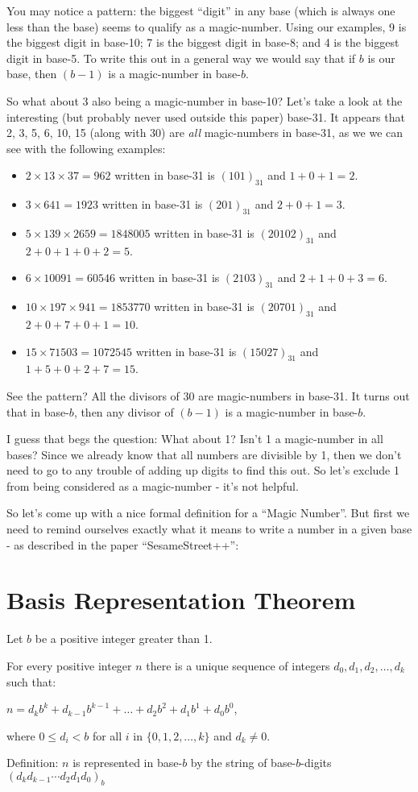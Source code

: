 \documentclass{article}
\newenvironment{jprIn}{\begin{adjustwidth}{2em}{}}{\end{adjustwidth}}
\begin{document}
You may notice a pattern: the biggest ``digit'' in any base (which is always one less than the base) seems to
qualify as a magic-number.
Using our examples, 9 is the biggest
digit in base-10; 7 is the biggest digit in base-8; and 4 is the biggest digit in base-5.  To write this out in a general way
we would say that if $b$ is our base, then $(b-1)$ is a magic-number in base-$b$.

So what about 3 also being a magic-number in base-10?  Let's take a look at the interesting (but probably never used outside this paper) base-31.
It appears that 2, 3, 5, 6, 10, 15 (along with 30) are \emph{all} magic-numbers in base-31, as we we can see
with the following examples:
\begin{itemize}
\item $2\times{}13\times{}37=962$ written in base-31 is $(101)_{31}$ and $1+0+1=2$.
\item $3\times{}641=1923$ written in base-31 is $(201)_{31}$ and $2+0+1=3$.
\item $5\times{}139\times{}2659=1848005$ written in base-31 is $(20102)_{31}$ and $2+0+1+0+2=5$.
\item $6\times{}10091=60546$ written in base-31 is $(2103)_{31}$ and $2+1+0+3=6$.
\item $10\times{}197\times{}941=1853770$ written in base-31 is $(20701)_{31}$ and $2+0+7+0+1=10$.
\item $15\times{}71503=1072545$ written in base-31 is $(15027)_{31}$ and $1+5+0+2+7=15$.
\end{itemize}

See the pattern? All the divisors of 30 are magic-numbers in base-31.
It turns out that in base-$b$, then any divisor of $(b-1)$ is a magic-number in base-$b$.

I guess that begs the question: What about 1? Isn't 1 a magic-number in all bases?
Since we already know that all numbers are divisible by 1,
then we don't need to go to any trouble of adding up digits to find this out.
So let's exclude 1 from being considered as a magic-number - it's not helpful.

So let's come up with a nice formal definition for a ``Magic Number''. But first we need to remind ourselves exactly
what it means to write a number in a given base - as described in the paper ``SesameStreet++'':

\section*{Basis Representation Theorem}
\begin{jprIn}
Let $b$ be a positive integer greater than 1.

For every positive integer $n$ there is a unique sequence
of integers $d_0, d_1, d_2,\dots{},d_k$ such that:

\hspace{3em}$n=d_kb^k+d_{k-1}b^{k-1}+\dots+d_2b^2+d_1b^1+d_0b^0$,

where $0\le{}d_i<b$ for all $i$ in $\{0,1,2,\dots{},k\}$ and $d_k\ne0$.

Definition: $n$ is represented in base-$b$ by the string
of base-$b$-digits $(d_kd_{k-1}{\cdots}d_2d_1d_0)_b$
\end{jprIn}
\end{document}
